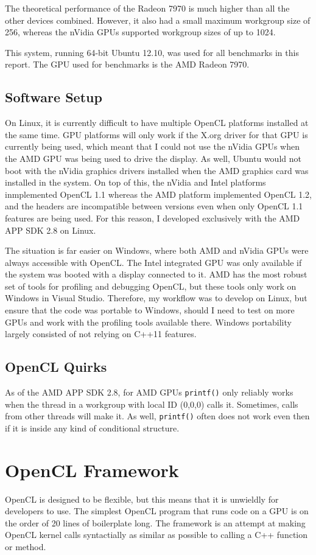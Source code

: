 \documentclass{article}
\begin{document}
The theoretical performance of the Radeon 7970 is much higher than all the other devices combined. However, it also had a small maximum workgroup size of 256, whereas the nVidia GPUs supported workgroup sizes of up to 1024.

This system, running 64-bit Ubuntu 12.10, was used for all benchmarks in this report. The GPU used for benchmarks is the AMD Radeon 7970.

\subsection{Software Setup}
On Linux, it is currently difficult to have multiple OpenCL platforms installed at the same time. GPU platforms will only work if the X.org driver for that GPU is currently being used, which meant that I could not use the nVidia GPUs when the AMD GPU was being used to drive the display. As well, Ubuntu would not boot with the nVidia graphics drivers installed when the AMD graphics card was installed in the system. On top of this, the nVidia and Intel platforms inmplemented OpenCL 1.1 whereas the AMD platform implemented OpenCL 1.2, and the headers are incompatible between versions even when only OpenCL 1.1 features are being used. For this reason, I developed exclusively with the AMD APP SDK 2.8 on Linux.

The situation is far easier on Windows, where both AMD and nVidia GPUs were always accessible with OpenCL. The Intel integrated GPU was only available if the system was booted with a display connected to it. AMD has the most robust set of tools for profiling and debugging OpenCL, but these tools only work on Windows in Visual Studio. Therefore, my workflow was to develop on Linux, but ensure that the code was portable to Windows, should I need to test on more GPUs and work with the profiling tools available there. Windows portability largely consisted of not relying on C++11 features.

\subsection{OpenCL Quirks}
As of the AMD APP SDK 2.8, for AMD GPUs \texttt{printf()} only reliably works when the thread in a workgroup with local ID (0,0,0) calls it. Sometimes, calls from other threads will make it. As well, \texttt{printf()} often does not work even then if it is inside any kind of conditional structure.

\section{OpenCL Framework}
OpenCL is designed to be flexible, but this means that it is unwieldly for developers to use. The simplest OpenCL program that runs code on a GPU is on the order of 20 lines of boilerplate long. The framework is an attempt at making OpenCL kernel calls syntactially as similar as possible to calling a C++ function or method.
\end{document}
